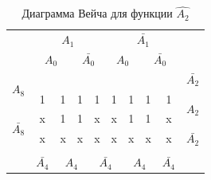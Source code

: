 \documentclass[a4paper,14pt]{article}
\begin{document}
\begin{table}[H]
	\begin{minipage}{.5\linewidth}
		\caption{Диаграмма Вейча для функции $\hat{A_2}$}
		\centering
		\begin{tabular}{cccccccccc}
			& \multicolumn{4}{c}{$A_1$}                                                                         & \multicolumn{4}{c}{$\bar{A_1}$}                                                                   &                        \\
			& \multicolumn{2}{c}{$A_0$}                       & \multicolumn{2}{c}{$\bar{A_0}$}                 & \multicolumn{2}{c}{$A_0$}                       & \multicolumn{2}{c}{$\bar{A_0}$}                 &                        \\ \cline{2-9}
			\multicolumn{1}{c|}{\multirow{2}{*}{$A_8$}}       & \multicolumn{1}{c|}{}  & \multicolumn{1}{c|}{}  & \multicolumn{1}{c|}{}  & \multicolumn{1}{c|}{}  & \multicolumn{1}{c|}{}  & \multicolumn{1}{c|}{}  & \multicolumn{1}{c|}{}  & \multicolumn{1}{c|}{}  & $\bar{A_2}$            \\ \cline{2-9}
			\multicolumn{1}{c|}{}                             & \multicolumn{1}{c|}{1} & \multicolumn{1}{c|}{1} & \multicolumn{1}{c|}{1} & \multicolumn{1}{c|}{1} & \multicolumn{1}{c|}{1} & \multicolumn{1}{c|}{1} & \multicolumn{1}{c|}{1} & \multicolumn{1}{c|}{1} & \multirow{2}{*}{$A_2$} \\ \cline{2-9}
			\multicolumn{1}{c|}{\multirow{2}{*}{$\bar{A_8}$}} & \multicolumn{1}{c|}{x} & \multicolumn{1}{c|}{1} & \multicolumn{1}{c|}{1} & \multicolumn{1}{c|}{x} & \multicolumn{1}{c|}{x} & \multicolumn{1}{c|}{1} & \multicolumn{1}{c|}{1} & \multicolumn{1}{c|}{x} &                        \\ \cline{2-9}
			\multicolumn{1}{c|}{}                             & \multicolumn{1}{c|}{x} & \multicolumn{1}{c|}{x} & \multicolumn{1}{c|}{x} & \multicolumn{1}{c|}{x} & \multicolumn{1}{c|}{x} & \multicolumn{1}{c|}{x} & \multicolumn{1}{c|}{x} & \multicolumn{1}{c|}{x} & $\bar{A_2}$            \\ \cline{2-9}
			\\
			& $\bar{A_4}$            & \multicolumn{2}{c}{$A_4$}                       & \multicolumn{2}{c}{$\bar{A_4}$}                 & \multicolumn{2}{c}{$A_4$}                       & $\bar{A_4}$            &                       
		\end{tabular}
	\end{minipage}%
	\begin{minipage}{.5\linewidth}

\end{minipage}
\end{table}
\end{document}
